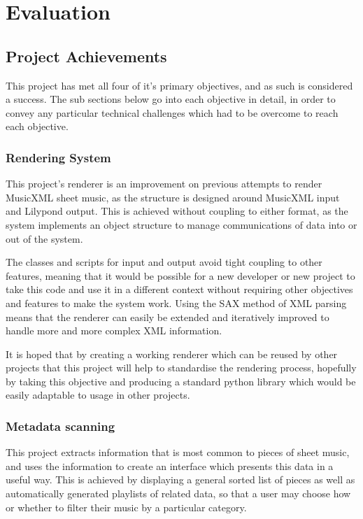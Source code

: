 \section{Evaluation}
\subsection{Project Achievements}
This project has met all four of it's primary objectives, and as such is considered a success. The sub sections below go into each objective in detail, in order to convey any particular technical challenges which had to be overcome to reach each objective.
\subsubsection{Rendering System}
This project's renderer is an improvement on previous attempts to render MusicXML sheet music, as the structure is designed around MusicXML input and Lilypond output. This is achieved without coupling to either format, as the system implements an object structure to manage communications of data into or out of the system.

The classes and scripts for input and output avoid tight coupling to other features, meaning that it would be possible for a new developer or new project to take this code and use it in a different context without requiring other objectives and features to make the system work. Using the SAX method of XML parsing means that the renderer can easily be extended and iteratively improved to handle more and more complex XML information.

It is hoped that by creating a working renderer which can be reused by other projects that this project will help to standardise the rendering process, hopefully by taking this objective and producing a standard python library which would be easily adaptable to usage in other projects.

\subsubsection{Metadata scanning}
This project extracts information that is most common to pieces of sheet music, and uses the information to create an interface which presents this data in a useful way. This is achieved by displaying a general sorted list of pieces as well as automatically generated playlists of related data, so that a user may choose how or whether to filter their music by a particular category.

